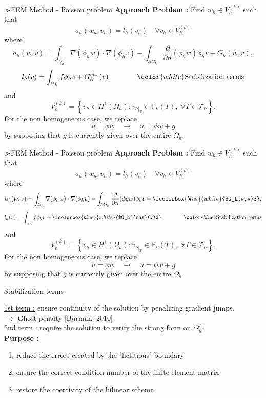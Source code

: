 \begin{frame}{$\phi$-FEM Method - Poisson problem}
    \textbf{Approach Problem :} Find $w_h\in V_h^{(k)}$ such that 
    $$a_h(w_h,v_h) = l_h(v_h) \quad \forall v_h \in V_h^{(k)}$$
    where
    $$a_h(w,v)=\int_{\Omega_h} \nabla (\phi_h w) \cdot \nabla (\phi_h v) - \int_{\partial\Omega_h} \frac{\partial}{\partial n}(\phi_h w)\phi_h v+G_h(w,v),$$
    $$l_h(v)=\int_{\Omega_h} f \phi_h v + G_h^{rhs}(v) \qquad \qquad \color{white}\text{Stabilization terms}$$
    and 
    $$V_h^{(k)}=\left\{v_h\in H^1(\Omega_h):v_{h|_T}\in\mathbb{P}_k(T), \; \forall T\in\mathcal{T}_h\right\}.$$
    For the non homogeneous case, we replace
    $$u=\phi w \quad \rightarrow \quad u=\phi w+g$$ 
    by supposing that $g$ is currently given over the entire $\Omega_h$.
\end{frame}

\begin{frame}[noframenumbering]{$\phi$-FEM Method - Poisson problem}
    \textbf{Approach Problem :} Find $w_h\in V_h^{(k)}$ such that 
    $$a_h(w_h,v_h) = l_h(v_h) \quad \forall v_h \in V_h^{(k)}$$
    where
    $$a_h(w,v)=\int_{\Omega_h} \nabla (\phi_h w) \cdot \nabla (\phi_h v) - \int_{\partial\Omega_h} \frac{\partial}{\partial n}(\phi_h w)\phi_h v+\fcolorbox{blue}{white}{$G_h(w,v)$},$$
    $$l_h(v)=\int_{\Omega_h} f \phi_h v + \fcolorbox{blue}{white}{$G_h^{rhs}(v)$} \qquad \qquad \color{blue}\text{Stabilization terms}$$
    and 
    $$V_h^{(k)}=\left\{v_h\in H^1(\Omega_h):v_{h|_T}\in\mathbb{P}_k(T), \; \forall T\in\mathcal{T}_h\right\}.$$
    For the non homogeneous case, we replace
    $$u=\phi w \quad \rightarrow \quad u=\phi w+g$$ 
    by supposing that $g$ is currently given over the entire $\Omega_h$.
\end{frame}

\begin{frame}{Stabilization terms}
    \begin{center}
        \centering
    \end{center}
    \small
    \underline{1st term :} ensure continuity of the solution by penalizing gradient jumps. \\
    $\rightarrow$ Ghost penalty [Burman, 2010] \\
    \underline{2nd term :} require the solution to verify the strong form on $\Omega_h^\Gamma$. \\
    \normalsize
    \textbf{Purpose :} 
    \begin{enumerate}[\ding{217}]
        \item reduce the errors created by the "fictitious" boundary 
        \item ensure the correct condition number of the finite element matrix
        \item restore the coercivity of the bilinear scheme
    \end{enumerate}
\end{frame}
        
